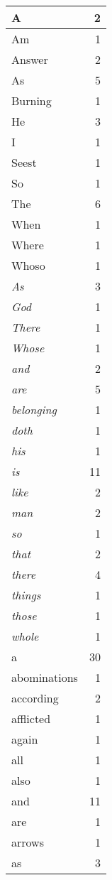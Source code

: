 \begin{center}
\begin{longtable}{l|r}
A & 2\\ \hline 
Am & 1\\ \hline 
Answer & 2\\ \hline 
As & 5\\ \hline 
Burning & 1\\ \hline 
He & 3\\ \hline 
I & 1\\ \hline 
Seest & 1\\ \hline 
So & 1\\ \hline 
The & 6\\ \hline 
When & 1\\ \hline 
Where & 1\\ \hline 
Whoso & 1\\ \hline 
\emph{As} & 3\\ \hline 
\emph{God} & 1\\ \hline 
\emph{There} & 1\\ \hline 
\emph{Whose} & 1\\ \hline 
\emph{and} & 2\\ \hline 
\emph{are} & 5\\ \hline 
\emph{belonging} & 1\\ \hline 
\emph{doth} & 1\\ \hline 
\emph{his} & 1\\ \hline 
\emph{is} & 11\\ \hline 
\emph{like} & 2\\ \hline 
\emph{man} & 2\\ \hline 
\emph{so} & 1\\ \hline 
\emph{that} & 2\\ \hline 
\emph{there} & 4\\ \hline 
\emph{things} & 1\\ \hline 
\emph{those} & 1\\ \hline 
\emph{whole} & 1\\ \hline 
a & 30\\ \hline 
abominations & 1\\ \hline 
according & 2\\ \hline 
afflicted & 1\\ \hline 
again & 1\\ \hline 
all & 1\\ \hline 
also & 1\\ \hline 
and & 11\\ \hline 
are & 1\\ \hline 
arrows & 1\\ \hline 
as & 3\\ \hline 

\end{longtable}
\end{center}
